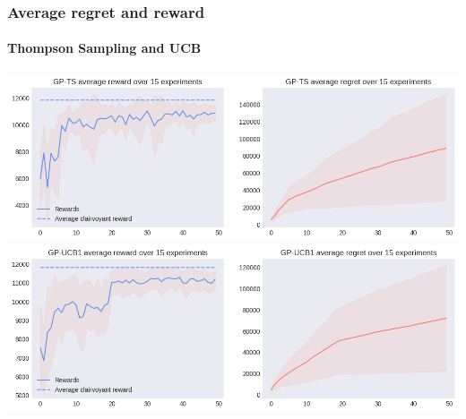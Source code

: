 
\begin{frame}[plain]

\frametitle{Average regret and reward}
\framesubtitle{Thompson Sampling and UCB}

\begin{center}
	\includegraphics[scale=0.4]{img/Graphs/uncertain_alpha_unit/image4.png}
	\includegraphics[scale=0.4]{img/Graphs/uncertain_alpha_unit/image5.png}
\end{center}

\end{frame}


